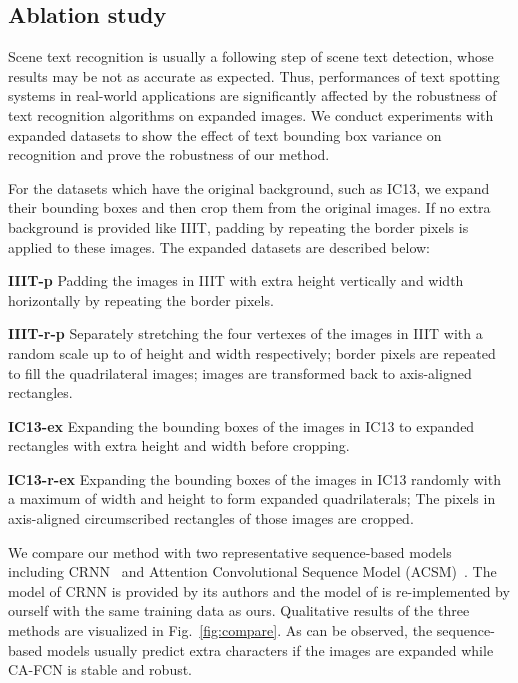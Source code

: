\documentclass[letterpaper]{article} \usepackage{aaai19}  \usepackage{times}  \usepackage{helvet}  \usepackage{courier}  \usepackage{url}  \usepackage{graphicx}  \frenchspacing  \usepackage{multirow}
\begin{document}
\subsection{Ablation study}\label{sec:expanding}
Scene text recognition is usually a following step of scene text detection, whose results may be not as accurate as expected. Thus, performances of text spotting systems in real-world applications are significantly affected by the robustness of text recognition algorithms on expanded images. We conduct experiments with expanded datasets to show the effect of text bounding box variance on recognition and prove the robustness of our method.

For the datasets which have the original background, such as IC13, we expand their bounding boxes and then crop them from the original images. If no extra background is provided like IIIT, padding by repeating the border pixels is applied to these images. The expanded datasets are described below:

\noindent\textbf{IIIT-p}
Padding the images in IIIT with extra  height vertically and  width horizontally by repeating the border pixels.

\noindent\textbf{IIIT-r-p}
Separately stretching the four vertexes of the images in IIIT with a random scale up to  of height and width respectively; border pixels are repeated to fill the quadrilateral images; images are transformed back to axis-aligned rectangles.

\noindent\textbf{IC13-ex}
Expanding the bounding boxes of the images in IC13 to expanded rectangles with extra  height and width before cropping.

\noindent\textbf{IC13-r-ex}
Expanding the bounding boxes of the images in IC13 randomly with a maximum  of width and height to form expanded quadrilaterals; The pixels in axis-aligned circumscribed rectangles of those images are cropped.

We compare our method with two representative sequence-based models including CRNN~\cite{DBLP:journals/pami/ShiBY17} and Attention Convolutional Sequence Model (ACSM)~\cite{DBLP:journals/corr/gao}. 
The model of CRNN is provided by its authors and the model of \cite{DBLP:journals/corr/gao} is re-implemented by ourself with the same training data as ours.
Qualitative results of the three methods are visualized in Fig.~\ref{fig:compare}. As can be observed, the sequence-based models usually predict extra characters if the images are expanded while CA-FCN is stable and robust. 
\end{document}
